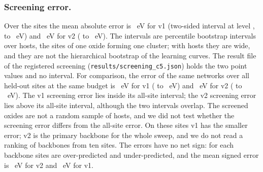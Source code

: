 \subsubsection{Screening error.}
Over the \numScreeningDemoScopeNScreenedSites{} sites the mean absolute error is \numScreeningDemoSummaryVOneMaeEV{}~eV for v1 (two-sided interval at level \numCfgStatsCi{}, \numScreeningDemoSummaryVOneMaeCiLo{} to \numScreeningDemoSummaryVOneMaeCiHi{}~eV) and \numScreeningDemoSummaryVTwoMaeEV{}~eV for v2 (\numScreeningDemoSummaryVTwoMaeCiLo{} to \numScreeningDemoSummaryVTwoMaeCiHi{}~eV). The intervals are percentile bootstrap intervals over hosts, the sites of one oxide forming one cluster; with \numScreeningDemoScopeNHosts{} hosts they are wide, and they are not the hierarchical bootstrap of the learning curves. The result file of the registered screening (\texttt{results/screening\_c5.json}) holds the two point values and no interval. For comparison, the error of the same networks over all held-out sites at the same budget is \numCOneCTwoVOneMaeSixHundredFiftyFourSMaeMean{}~eV for v1 (\numCOneCTwoVOneMaeSixHundredFiftyFourSMaeCiLo{} to \numCOneCTwoVOneMaeSixHundredFiftyFourSMaeCiHi{}~eV) and \numCOneCTwoVTwoMaeSixHundredFiftyFourSMaeMean{}~eV for v2 (\numCOneCTwoVTwoMaeSixHundredFiftyFourSMaeCiLo{} to \numCOneCTwoVTwoMaeSixHundredFiftyFourSMaeCiHi{}~eV). The v1 screening error lies inside its all-site interval; the v2 screening error lies above its all-site interval, although the two intervals overlap. The screened oxides are not a random sample of hosts, and we did not test whether the screening error differs from the all-site error. On these sites v1 has the smaller error; v2 is the primary backbone for the whole sweep, and we do not read a ranking of backbones from ten sites. The errors have no net sign: for each backbone \numScreeningDemoSummaryVTwoNOverPrediction{} sites are over-predicted and \numScreeningDemoSummaryVTwoNUnderPrediction{} under-predicted, and the mean signed error is \numScreeningDemoSummaryVTwoBiasEV{}~eV for v2 and \numScreeningDemoSummaryVOneBiasEV{}~eV for v1.

